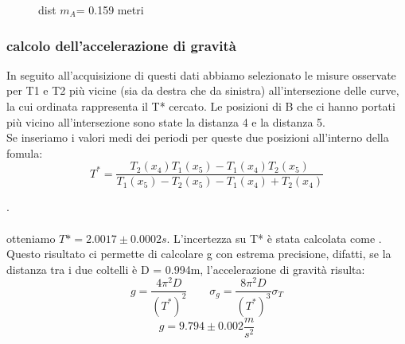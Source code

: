 \documentclass[a4paper]{article}
\theoremstyle{definition}
\begin{document}
	\begin{figure}[!htbp]
	\captionsetup{labelformat=empty}
	\caption{dist \(m_{A}\)= 0.159 metri}
\end{figure}

	\subsubsection*{calcolo dell'accelerazione di gravità}
In seguito all'acquisizione di questi dati abbiamo selezionato le misure osservate per T1 e T2 più vicine (sia da destra che da sinistra) all'intersezione delle curve, la cui ordinata rappresenta il T* cercato. Le posizioni di B che ci hanno portati più vicino all'intersezione sono state la distanza 4 e la distanza 5.\\
Se inseriamo i valori medi dei periodi per queste due posizioni all'interno della fomula:
\[T^{*} = \frac{T_{2}(x_{4})T_{1}(x_{5})-T_{1}(x_{4})T_{2}(x_{5})}{T_{1}(x_{5})-T_{2}(x_{5})-T_{1}(x_{4})+T_{2}(x_{4})}\]

.\\\\
otteniamo \(T*=2.0017 \pm 0.0002 s\). L'incertezza su T* è stata calcolata come 
.\\
\noindent Questo risultato ci permette di calcolare g con estrema precisione, difatti, se la distanza tra i due coltelli è D = 0.994m, l'accelerazione di gravità risulta:
\[g = \frac{4\pi ^{2}D}{(T^{*})^{2}} \qquad \sigma _{g} = \frac{8\pi ^{2}D}{(T^{*})^{3}}\sigma _{T}\]
\[g = 9.794 \pm 0.002 \frac{m}{s^{2}}\]
\end{document}
